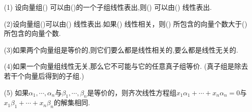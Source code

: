\documentclass[a4paper]{report}
\begin{document}
(1) 设向量组(\uppercase\expandafter{}) 可以由(\uppercase\expandafter{})的一个子组线性表出,则(\uppercase\expandafter{}) 可以由(\uppercase\expandafter{}) 线性表出.

(2)设向量组(\uppercase\expandafter{})可以由(\uppercase\expandafter{}) 线性表出.如果(\uppercase\expandafter{}) 线性相关，则(\uppercase\expandafter{}) 所包含的向量个数大于(\uppercase\expandafter{}) 所包含的向量个数.

(3)如果两个向量组是等价的,则它们要么都是线性相关的,要么都是线性无关的.

(4)如果一个向量组线性无关,那么它不可能与它的任意真子组等价. (真子组是除去若干个向量后得到的子组.)

(5) 如果$\alpha_1,\cdots,\alpha_n$与$\beta_1,\cdots,\beta_n$是等价的，则齐次线性方程组$x_1\alpha_1+\cdots+x_n\alpha_n=0$与
$x_1\beta_1+\cdots+x_n\beta_n$的解集相同.
\end{document}
